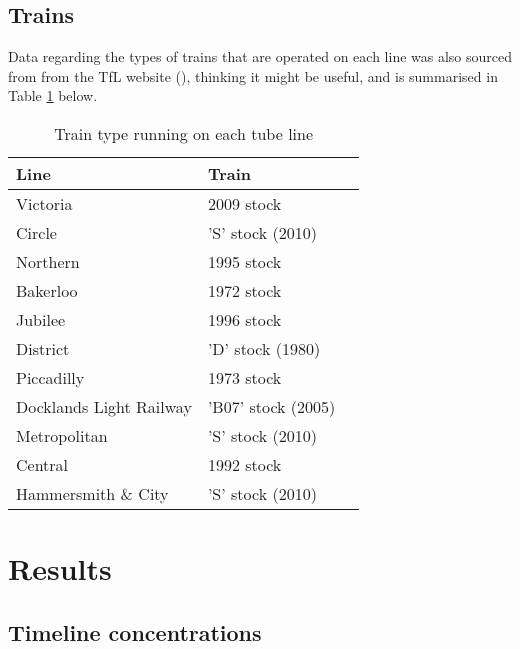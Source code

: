 \subsection{Trains}
\label{subsec:trains}
Data regarding the types of trains that are operated on each line was also sourced from from the TfL website (\cite{TransportforLondon2016}), thinking it might be useful, and is summarised in Table \ref{tab:train_type_on_the_underground} below.


\begin{table}[H]
\centering
    \begin{tabular}{ | l | l | l |}
    \hline 
     \bfseries{Line} & \bfseries{Train}             \\ \hline
        Victoria                &   2009 stock      \\ \hline
        Circle                  &   'S' stock (2010)       \\ \hline
        Northern                &   1995 stock      \\ \hline
        Bakerloo                &   1972 stock      \\ \hline
        Jubilee                 &   1996 stock      \\ \hline
        District                &   'D' stock (1980)      \\ \hline
        Piccadilly              &   1973 stock      \\ \hline
        Docklands Light Railway &   'B07' stock (2005)     \\ \hline
        Metropolitan            &   'S' stock (2010)       \\ \hline
        Central                 &   1992 stock      \\ \hline
        Hammersmith \& City     &   'S' stock (2010)       \\ \hline
        \end{tabular}
\caption{Train type running on each tube line}
\label{tab:train_type_on_the_underground}
\end{table}

\section{Results}
\label{sec:3results}

\subsection{Timeline concentrations}
\label{subsec:timeline_concentrations}

